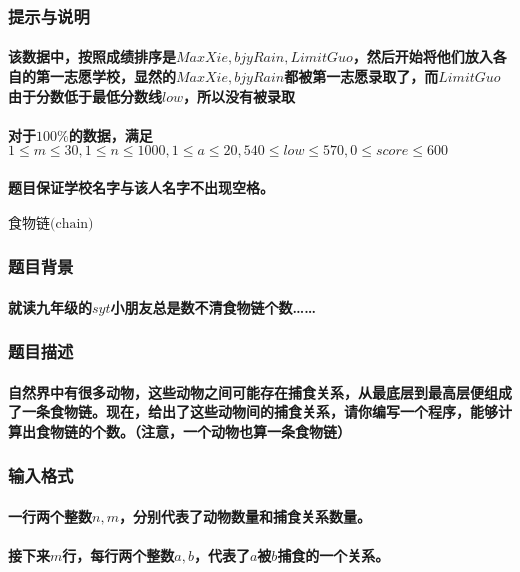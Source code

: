 \documentclass[final,11pt,oneside,UTF8]{report}
\begin{document}
\subsubsection{提示与说明}
\paragraph{
    该数据中，按照成绩排序是$MaxXie,bjyRain,LimitGuo$，然后开始将他们放入各自的第一志愿学校，显然的$MaxXie,bjyRain$都被第一志愿录取了，而$LimitGuo$由于分数低于最低分数线$low$，所以没有被录取
}
\paragraph{
    对于$100\%$的数据，满足$1 \le m \le 30, 1 \le n \le 1000, 1 \le a \le 20, 540\le low \le 570,0 \le score \le 600$
}
\paragraph{
    题目保证学校名字与该人名字不出现空格。
}
\newpage

\centerline{\LARGE{$\textbf{食物链}\text{(chain)}$}}
\subsubsection{题目背景}
\paragraph{
    就读九年级的$syt$小朋友总是数不清食物链个数……
}
\subsubsection{题目描述}
\paragraph{
    自然界中有很多动物，这些动物之间可能存在捕食关系，从最底层到最高层便组成了一条食物链。现在，给出了这些动物间的捕食关系，请你编写一个程序，能够计算出食物链的个数。（注意，一个动物也算一条食物链）
}
\subsubsection{输入格式}
\paragraph{
    一行两个整数$n,m$，分别代表了动物数量和捕食关系数量。
}
\paragraph{
    接下来$m$行，每行两个整数$a,b$，代表了$a$被$b$捕食的一个关系。
}
\end{document}
